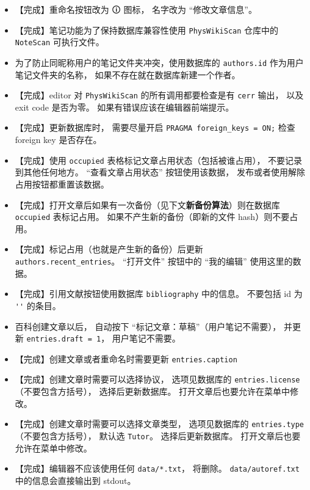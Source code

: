 \begin{itemize}
\item 【完成】重命名按钮改为 🛈 图标， 名字改为 “修改文章信息”。
\item 【完成】笔记功能为了保持数据库兼容性使用 \verb`PhysWikiScan` 仓库中的 \verb`NoteScan` 可执行文件。
\item 为了防止同昵称用户的笔记文件夹冲突，使用数据库的 \verb`authors.id` 作为用户笔记文件夹的名称， 如果不存在就在数据库新建一个作者。
\item 【完成】editor 对 \verb`PhysWikiScan` 的所有调用都要检查是有 \verb`cerr` 输出， 以及 exit code 是否为零。 如果有错误应该在编辑器前端提示。
\item 【完成】更新数据库时， 需要尽量开启 \verb`PRAGMA foreign_keys = ON;` 检查 foreign key 是否存在。
\item 【完成】使用 \verb`occupied` 表格标记文章占用状态（包括被谁占用）， 不要记录到其他任何地方。 “查看文章占用状态” 按钮使用该数据， 发布或者使用解除占用按钮都重置该数据。
\item 【完成】打开文章后如果有一次备份（见下文\textbf{新备份算法}）则在数据库 \verb`occupied` 表标记占用。 如果不产生新的备份（即新的文件 hash）则不要占用。
\item 【完成】标记占用（也就是产生新的备份）后更新 \verb`authors.recent_entries`。 “打开文件” 按钮中的 “我的编辑” 使用这里的数据。
\item 【完成】引用文献按钮使用数据库 \verb`bibliography` 中的信息。 不要包括 id 为 \verb`''` 的条目。
\item 百科创建文章以后， 自动按下 “标记文章：草稿”（用户笔记不需要）， 并更新 \verb`entries.draft = 1`， 用户笔记不需要。
\item 【完成】创建文章或者重命名时需要更新 \verb`entries.caption`
\item 【完成】创建文章时需要可以选择协议， 选项见数据库的 \verb`entries.license`（不要包含方括号）， 选择后更新数据库。 打开文章后也要允许在菜单中修改。
\item 【完成】创建文章时需要可以选择文章类型， 选项见数据库的 \verb`entries.type`（不要包含方括号）， 默认选 \verb`Tutor`。 选择后更新数据库。 打开文章后也要允许在菜单中修改。
\item 【完成】编辑器不应该使用任何 \verb`data/*.txt`， 将删除。 \verb`data/autoref.txt` 中的信息会直接输出到 stdout。



\end{itemize}
